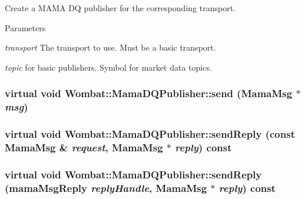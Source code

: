 Create a MAMA DQ publisher for the corresponding transport. 
\begin{DoxyParams}{Parameters}
\item[{\em transport}]The transport to use. Must be a basic transport. \item[{\em topic}]for basic publishers. Symbol for market data topics. \end{DoxyParams}
\hypertarget{classWombat_1_1MamaDQPublisher_a5c6530a260495e16e494121134990cba}{
\subsubsection[{send}]{\setlength{\rightskip}{0pt plus 5cm}virtual void Wombat::MamaDQPublisher::send ({\bf MamaMsg} $\ast$ {\em msg})}}
\label{classWombat_1_1MamaDQPublisher_a5c6530a260495e16e494121134990cba}
\hypertarget{classWombat_1_1MamaDQPublisher_a3a7c72fc23212292260c7955362acbb1}{
\subsubsection[{sendReply}]{\setlength{\rightskip}{0pt plus 5cm}virtual void Wombat::MamaDQPublisher::sendReply (const {\bf MamaMsg} \& {\em request}, \/  {\bf MamaMsg} $\ast$ {\em reply}) const}}
\label{classWombat_1_1MamaDQPublisher_a3a7c72fc23212292260c7955362acbb1}
\hypertarget{classWombat_1_1MamaDQPublisher_ab91d581e94f91555d48070e861b12c8e}{
\subsubsection[{sendReply}]{\setlength{\rightskip}{0pt plus 5cm}virtual void Wombat::MamaDQPublisher::sendReply (mamaMsgReply {\em replyHandle}, \/  {\bf MamaMsg} $\ast$ {\em reply}) const}}
\label{classWombat_1_1MamaDQPublisher_ab91d581e94f91555d48070e861b12c8e}
